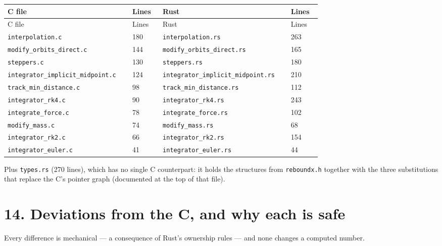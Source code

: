 \documentclass[11pt]{article}
\begin{document}
\begin{longtable}{L{0.374\linewidth}L{0.095\linewidth}L{0.386\linewidth}L{0.095\linewidth}}
\toprule
C file & Lines & Rust & Lines \\
\midrule
\endfirsthead
\toprule
C file & Lines & Rust & Lines \\
\midrule
\endhead
\texttt{interpolation.c} & 180 & \texttt{interpolation.rs} & 263 \\
\texttt{modify\_orbits\_direct.c} & 144 & \texttt{modify\_orbits\_direct.rs} & 165 \\
\texttt{steppers.c} & 130 & \texttt{steppers.rs} & 180 \\
\texttt{integrator\_implicit\_midpoint.c} & 124 & \texttt{integrator\_implicit\_midpoint.rs} & 210 \\
\texttt{track\_min\_distance.c} & 98 & \texttt{track\_min\_distance.rs} & 112 \\
\texttt{integrator\_rk4.c} & 90 & \texttt{integrator\_rk4.rs} & 243 \\
\texttt{integrate\_force.c} & 78 & \texttt{integrate\_force.rs} & 102 \\
\texttt{modify\_mass.c} & 74 & \texttt{modify\_mass.rs} & 68 \\
\texttt{integrator\_rk2.c} & 66 & \texttt{integrator\_rk2.rs} & 154 \\
\texttt{integrator\_euler.c} & 41 & \texttt{integrator\_euler.rs} & 44 \\
\bottomrule
\end{longtable}

Plus \texttt{types.rs} (270 lines), which has no single C counterpart: it holds the structures from \texttt{reboundx.h} together with the three substitutions that replace the C's pointer graph (documented at the top of that file).

\section{14. Deviations from the C, and why each is safe}

Every difference is mechanical --- a consequence of Rust's ownership rules --- and none changes a computed number.
\end{document}
